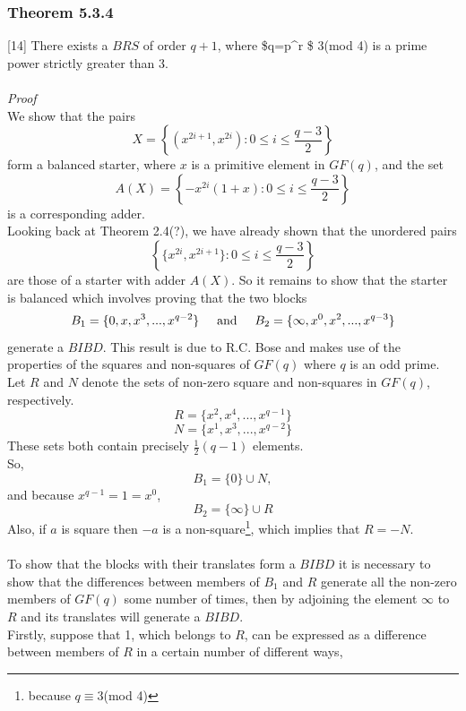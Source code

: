 \documentclass[
  12pt,
  a4paper]{book}
\begin{document}
\hypertarget{theorem-5.3.4}{%
\subsubsection{Theorem 5.3.4}\label{theorem-5.3.4}}

{[}14{]} There exists a \(BRS\) of order \(q+1\), where \$q=p\^{}r \equiv \$ 3(mod 4)
is a prime power strictly greater than 3.\\
~\\
\emph{Proof}\\
We show that the pairs
\[X = \left \{(x^{2i+1},x^{2i}): 0 \leq i \leq \frac{q-3}{2} \right \}\]
form a balanced starter, where \(x\) is a primitive element in \(GF(q)\),
and the set
\[A(X) = \left \{-x^{2i}(1+x): 0 \leq i \leq \frac{q-3}{2} \right \}\]
is a corresponding adder.\\
Looking back at Theorem 2.4(?), we have already shown that the unordered
pairs
\[\left \{\{x^{2i},x^{2i+1}\}: 0 \leq i \leq \frac{q-3}{2} \right \}\]
are those of a starter with adder \(A(X)\). So it remains to show that the
starter is balanced which involves proving that the two blocks
\[B_1 = \{0,x,x^3,...,x^{q-2}\} \hspace{0.5cm} \mathrm{and} \hspace{0.5cm} B_2 = \{\infty,x^0,x^2,...,x^{q-3}\}\]
generate a \(BIBD\). This result is due to R.C. Bose and makes use of the
properties of the squares and non-squares of \(GF(q)\) where \(q\) is an odd
prime.\\
Let \(R\) and \(N\) denote the sets of non-zero square and non-squares in
\(GF(q)\), respectively. \[R=\{x^2,x^4,...,x^{q-1}\}\]
\[N=\{x^1,x^3,...,x^{q-2}\}\] These sets both contain precisely
\(\frac{1}{2}(q-1)\) elements.\\
So, \[B_1 = \{0\} \cup N,\] and because \(x^{q-1} = 1 = x^0\),\\
\[B_2 = \{\infty\} \cup R\] Also, if \(a\) is square then \(-a\) is a
non-square\footnote{because \(q \equiv 3\)(mod 4)}, which implies that \(R=-N\).\\
~\\
To show that the blocks with their translates form a \(BIBD\) it is
necessary to show that the differences between members of \(B_1\) and \(R\)
generate all the non-zero members of \(GF(q)\) some number of times, then
by adjoining the element \(\infty\) to \(R\) and its translates will
generate a \(BIBD\).\\
Firstly, suppose that 1, which belongs to \(R\), can be expressed as a
difference between members of \(R\) in a certain number of different ways,
\end{document}
